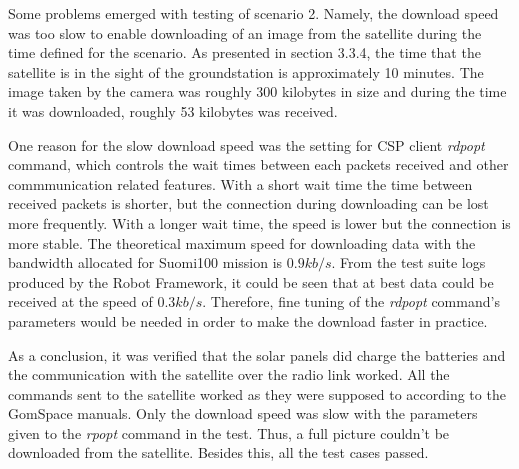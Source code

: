 \documentclass[english,12pt,a4paper,pdftex,elec,utf8]{aaltothesis}
\begin{document}
Some problems emerged with testing of scenario 2. Namely, the download speed was too slow to enable downloading of an image from the satellite during the time defined for the scenario. As presented in section 3.3.4, the time that the satellite is in the sight of the groundstation is approximately 10 minutes. The image taken by the camera was roughly 300 kilobytes in size and during the time it was downloaded, roughly 53 kilobytes was received.\par 
One reason for the slow download speed was the setting for CSP client \textit{rdpopt} command, which controls the wait times between each packets received and other commmunication related features. With a short wait time the time between received packets is shorter, but the connection during downloading can be lost more frequently. With a longer wait time, the speed is lower but the connection is more stable. The theoretical maximum speed for downloading data with the bandwidth allocated for Suomi100 mission is $0.9 kb/s$. From the test suite logs produced by the Robot Framework, it could be seen that at best data could be received at the speed of $0.3 kb/s$. Therefore, fine tuning of the \textit{rdpopt} command's parameters would be needed in order to make the download faster in practice.\par
As a conclusion, it was verified that the solar panels did charge the batteries and the communication with the satellite over the radio link worked. All the commands sent to the satellite worked as they were supposed to according to the GomSpace manuals. Only the download speed was slow with the parameters given to the \textit{rpopt} command in the test. Thus, a full picture couldn't be downloaded from the satellite. Besides this, all the test cases passed.\par      
\end{document}

